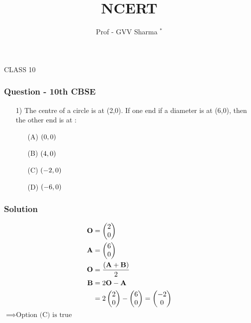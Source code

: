 \documentclass{beamer}
\begin{document}
\title{NCERT}
\author{ Prof - GVV Sharma $^{*}$}
\date{}
\frame{\titlepage}




\begin{frame}[standout]
    CLASS 10
\end{frame}


\begin{frame}
\frametitle{Question - 10th CBSE}
\begin{enumerate}
    \item [1)]
The centre of a circle is at (2,0). If one end if a diameter is at (6,0), then the other end is at :
\begin{enumerate}
\item [(A)] $\left(0,0\right)$
\item [(B)] $\left(4,0\right)$
\item [(C)] $\left(-2,0\right)$
\item [(D)] $\left(-6,0\right)$
\end{enumerate}
\end{enumerate}
\end{frame}




\begin{frame}
\frametitle{Solution}
\begin{align}
\textbf{O} &=
    \begin{pmatrix}
2 \\
0 
\end{pmatrix}\\
\textbf{A} &=
    \begin{pmatrix}
6 \\
0 
\end{pmatrix}
\\
\textbf{O} &= \dfrac{\left(\textbf{A} + \textbf{B}\right)}{2}\\
\textbf{B} &= 2\textbf{O} - \textbf{A}\\
    &=  2\begin{pmatrix}
2 \\
0 
\end{pmatrix} -  \begin{pmatrix}
6 \\
0 
\end{pmatrix}
=\begin{pmatrix}
   -2\\
   0
\end{pmatrix}
\end{align}
$\implies \text{Option (C) is true}$
\end{frame}
\end{document}
